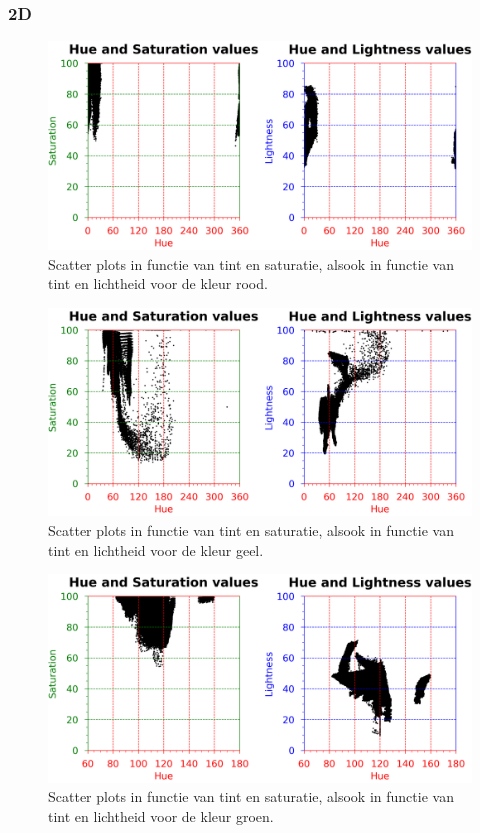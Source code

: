 \subsubsection{2D}

\begin{figure}[H]
	\center
	\includegraphics[width=\textwidth]{img/hslRed.png}
	\caption{Scatter plots in functie van tint en saturatie, alsook in functie van tint en lichtheid voor de kleur rood.}
	\label{hslRedPlot}
\end{figure}

\vspace{25mm}

\begin{figure}[H]
	\center
	\includegraphics[width=\textwidth]{img/hslYellow.png}
	\caption{Scatter plots in functie van tint en saturatie, alsook in functie van tint en lichtheid voor de kleur geel.}
	\label{hslYellowPlot}
\end{figure}

\begin{figure}[H]
	\center
	\includegraphics[width=\textwidth]{img/hslGreen.png}
	\caption{Scatter plots in functie van tint en saturatie, alsook in functie van tint en lichtheid voor de kleur groen.}
	\label{hslGreenPlot}
\end{figure}


